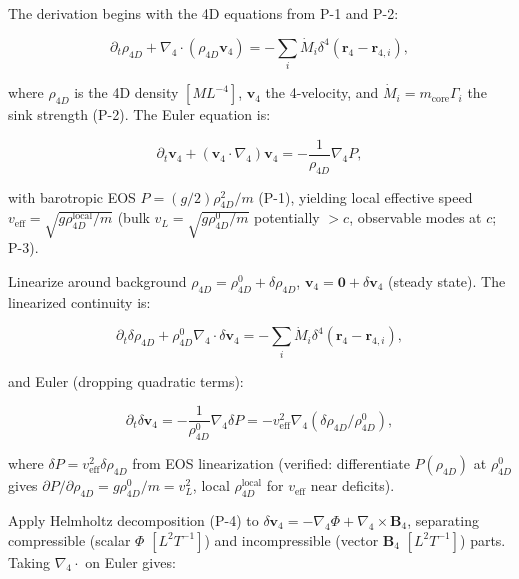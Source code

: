 The derivation begins with the 4D equations from P-1 and P-2:

\begin{equation}
\partial_t \rho_{4D} + \nabla_4 \cdot (\rho_{4D} \mathbf{v}_4) = -\sum_i \dot{M}_i \delta^4(\mathbf{r}_4 - \mathbf{r}_{4,i}),
\end{equation}

where $\rho_{4D}$ is the 4D density $[M L^{-4}]$, $\mathbf{v}_4$ the 4-velocity, and $\dot{M}_i = m_{\text{core}} \Gamma_i$ the sink strength (P-2). The Euler equation is:

\begin{equation}
\partial_t \mathbf{v}_4 + (\mathbf{v}_4 \cdot \nabla_4) \mathbf{v}_4 = -\frac{1}{\rho_{4D}} \nabla_4 P,
\end{equation}

with barotropic EOS $P = (g/2) \rho_{4D}^2 / m$ (P-1), yielding local effective speed $v_{\text{eff}} = \sqrt{g \rho_{4D}^{\text{local}} / m}$ (bulk $v_L = \sqrt{g \rho_{4D}^0 / m}$ potentially $>c$, observable modes at $c$; P-3).

Linearize around background $\rho_{4D} = \rho_{4D}^0 + \delta \rho_{4D}$, $\mathbf{v}_4 = \mathbf{0} + \delta \mathbf{v}_4$ (steady state). The linearized continuity is:

\begin{equation}
\partial_t \delta \rho_{4D} + \rho_{4D}^0 \nabla_4 \cdot \delta \mathbf{v}_4 = -\sum_i \dot{M}_i \delta^4(\mathbf{r}_4 - \mathbf{r}_{4,i}),
\end{equation}

and Euler (dropping quadratic terms):

\begin{equation}
\partial_t \delta \mathbf{v}_4 = -\frac{1}{\rho_{4D}^0} \nabla_4 \delta P = -v_{\text{eff}}^2 \nabla_4 (\delta \rho_{4D} / \rho_{4D}^0),
\end{equation}

where $\delta P = v_{\text{eff}}^2 \delta \rho_{4D}$ from EOS linearization (verified: differentiate $P(\rho_{4D})$ at $\rho_{4D}^0$ gives $\partial P / \partial \rho_{4D} = g \rho_{4D}^0 / m = v_L^2$, local $\rho_{4D}^{\text{local}}$ for $v_{\text{eff}}$ near deficits).

Apply Helmholtz decomposition (P-4) to $\delta \mathbf{v}_4 = -\nabla_4 \Phi + \nabla_4 \times \mathbf{B}_4$, separating compressible (scalar $\Phi$ $[L^2 T^{-1}]$) and incompressible (vector $\mathbf{B}_4$ $[L^2 T^{-1}]$) parts. Taking $\nabla_4 \cdot$ on Euler gives:

